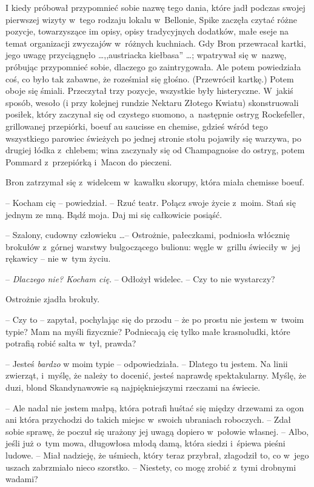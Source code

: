 \documentclass[oneside,polish,11pt,rmheadings]{mwbk}
\begin{document}
I kiedy próbował przypomnieć sobie nazwę tego dania, które jadł podczas swojej pierwszej wizyty w~tego rodzaju lokalu w~Bellonie, Spike zaczęła czytać różne pozycje, towarzyszące im opisy, opisy tradycyjnych dodatków, małe eseje na temat organizacji zwyczajów w~różnych kuchniach. Gdy Bron przewracał kartki,  jego uwagę przyciągnęło  \ldots  ,,austriacka kiełbasa'' \ldots ; wpatrywał się w~nazwę, próbując przypomnieć sobie, dlaczego go zaintrygowała. Ale potem powiedziała coś, co było tak zabawne, że roześmiał się głośno. (Przewrócił kartkę.) Potem oboje się śmiali. Przeczytał trzy pozycje, wszystkie były histeryczne. W~jakiś sposób, wesoło (i przy kolejnej rundzie Nektaru Złotego Kwiatu) skonstruowali posiłek, który zaczynał się od czystego suomono, a~następnie ostryg Rockefeller, grillowanej przepiórki, boeuf au saucisse en chemise, gdzieś wśród tego wszystkiego parowiec świeżych po jednej stronie stołu pojawiły się warzywa, po drugiej łódka z~chlebem; wina zaczynały się od Champagnoise do ostryg, potem Pommard z~przepiórką i~Macon do pieczeni. 

Bron zatrzymał się z~widelcem w~kawałku skorupy, która miała chemisse boeuf.   

-- Kocham cię -- powiedział. -- Rzuć teatr.  Połącz swoje życie z~moim. Stań się jednym ze mną. Bądź moja. Daj mi się całkowicie posiąść. 

-- Szalony, cudowny człowieku \ldots  -- Ostrożnie, pałeczkami, podniosła włócznię brokułów z~górnej warstwy bulgoczącego bulionu: węgle w~grillu świeciły w~jej rękawicy -- nie w~tym życiu. 

-- \textit{Dlaczego nie? Kocham cię}. -- Odłożył widelec. -- Czy to nie wystarczy?

Ostrożnie zjadła brokuły. 

-- Czy to -- zapytał, pochylając się do przodu -- że po prostu nie jestem w~twoim typie? Mam na myśli fizycznie? Podniecają cię tylko małe krasnoludki, które potrafią robić salta w~tył, prawda? 

-- Jesteś \textit{bardzo }w moim typie -- odpowiedziała. -- Dlatego tu jestem. Na linii zwierząt, i~myślę, że należy to docenić, jesteś naprawdę spektakularny. Myślę, że duzi, blond Skandynawowie są najpiękniejszymi rzeczami na świecie. 

-- Ale nadal nie jestem małpą, która potrafi huśtać się między drzewami za ogon ani która przychodzi do takich miejsc w~swoich ubraniach roboczych. -- Zdał sobie sprawę, że poczuł się urażony jej uwagą dopiero w~połowie własnej. -- Albo, jeśli już o~tym mowa, długowłosa młodą damą, która siedzi i~śpiewa pieśni ludowe. -- Miał nadzieję, że uśmiech, który teraz przybrał, złagodził to, co w~jego uszach zabrzmiało nieco szorstko. -- Niestety, co mogę zrobić z~tymi drobnymi wadami? 
\end{document}

